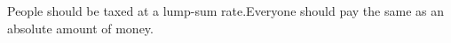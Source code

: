 People should be taxed at a lump-sum rate.Everyone should pay the same as an absolute amount of money.

